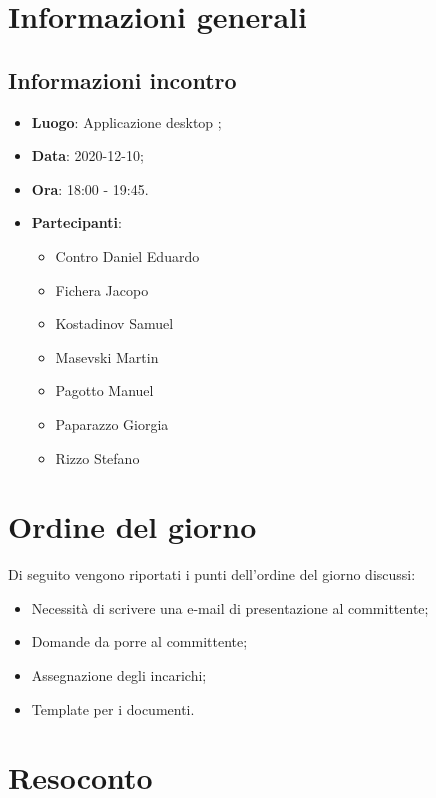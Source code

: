 \documentclass{article}
\begin{document}


\section{Informazioni generali}%
\label{sec:informazioni_generali}

\subsection{Informazioni incontro}%
\label{sub:informazioni_incontro}

\begin{itemize}
    \item \textbf{Luogo}: Applicazione desktop ;
    \item \textbf{Data}: 2020-12-10;
    \item \textbf{Ora}: 18:00 - 19:45.
    \item \textbf{Partecipanti}:
    \begin{itemize}
        \item Contro Daniel Eduardo
        \item Fichera Jacopo
        \item Kostadinov Samuel
        \item Masevski Martin
        \item Pagotto Manuel
        \item Paparazzo Giorgia
        \item Rizzo Stefano 
    \end{itemize}
\end{itemize}

\section{Ordine del giorno}%
\label{sec:ordine_del_giorno}

Di seguito vengono riportati i punti dell'ordine del giorno discussi:
\begin{itemize}
    \item Necessità di scrivere una e-mail di presentazione al committente;
    \item Domande da porre al committente;
    \item Assegnazione degli incarichi;
    \item Template per i documenti.
\end{itemize}

\section{Resoconto}%
\label{sec:resoconto}
\end{document}
